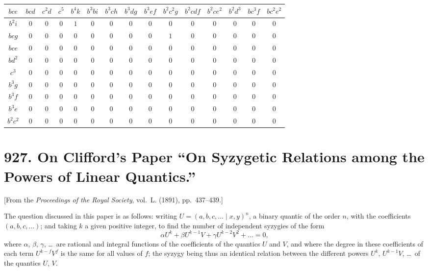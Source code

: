 \documentclass[11pt,a4paper]{book}
\begin{document}
\begin{longtable}{|c|c|c|c|c|c|c|c|c|c|c|c|c|c|c|}
\hline
$bce$ & $bcd$ & $c^2d$ & $c^5$ & $b^4k$ & $b^3bi$ & $b^3ch$ & $b^3dg$ & $b^3ef$ & $b^2c^2g$ & $b^2cdf$ & $b^2ce^2$ & $b^2d^3$ & $bc^3f$ & $bc^2e^2$\\
\hline
\endhead
$b^2i$ & $0$ & $0$ & $0$ & $1$ & $0$ & $0$ & $0$ & $0$ & $0$ & $0$ & $0$ & $0$ & $0$ & $0$\\
$bcg$ & $0$ & $0$ & $0$ & $0$ & $0$ & $0$ & $0$ & $0$ & $1$ & $0$ & $0$ & $0$ & $0$ & $0$\\
$bce$ & $0$ & $0$ & $0$ & $0$ & $0$ & $0$ & $0$ & $0$ & $0$ & $0$ & $0$ & $0$ & $0$ & $0$\\
$bd^2$ & $0$ & $0$ & $0$ & $0$ & $0$ & $0$ & $0$ & $0$ & $0$ & $0$ & $0$ & $0$ & $0$ & $0$\\
$c^3$ & $0$ & $0$ & $0$ & $0$ & $0$ & $0$ & $0$ & $0$ & $0$ & $0$ & $0$ & $0$ & $0$ & $0$\\
$b^3g$ & $0$ & $0$ & $0$ & $0$ & $0$ & $0$ & $0$ & $0$ & $0$ & $0$ & $0$ & $0$ & $0$ & $0$\\
$b^3f$ & $0$ & $0$ & $0$ & $0$ & $0$ & $0$ & $0$ & $0$ & $0$ & $0$ & $0$ & $0$ & $0$ & $0$\\
$b^3e$ & $0$ & $0$ & $0$ & $0$ & $0$ & $0$ & $0$ & $0$ & $0$ & $0$ & $0$ & $0$ & $0$ & $0$\\
$b^2c^2$ & $0$ & $0$ & $0$ & $0$ & $0$ & $0$ & $0$ & $0$ & $0$ & $0$ & $0$ & $0$ & $0$ & $0$\\
\hline
\end{longtable}



\newpage
\section*{927. On Clifford's Paper ``On Syzygetic Relations among the Powers of Linear Quantics.''}

[From the \textit{Proceedings of the Royal Society}, vol.~L. (1891), pp.~437--439.]

\bigskip

The question discussed in this paper is as follows: writing $U = (a, b, c, \ldots \mid x, y)^n$,
a binary quantic of the order $n$, with the coefficients $(a, b, c, \ldots)$; and taking $k$ a given
positive integer, to find the number of independent syzygies of the form
\[
\alpha U^k + \beta U^{k-1}V + \gamma U^{k-2}V^2 + \ldots = 0,
\]
where $\alpha$, $\beta$, $\gamma$, \ldots\ are rational and integral functions of the coefficients of the
quantics $U$ and $V$, and where the degree in these coefficients of each term $U^{k-f}V^f$
is the same for all values of $f$; the syzygy being thus an identical relation between
the different powers $U^k$, $U^{k-1}V$, \ldots\ of the quantics $U$, $V$.
\end{document}
